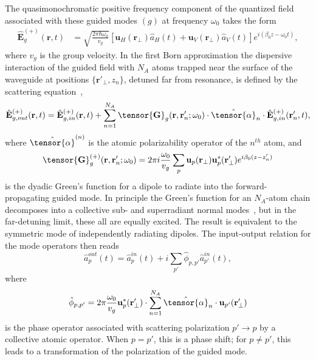 \documentclass[preprint,aps,pra,onecolumn,superscriptaddress]{revtex4-1} %
\def\br{\mathbf{r}}
\newcommand{\mbf}[1]{\mathbf{#1}}
\begin{document}
The quasimonochromatic positive frequency component of the quantized field associated with these guided modes $(g)$ at frequency $\omega_0$ takes the form
\begin{align}\label{eq:Ebp}
\hat{\mathbf{E}}^{(+)}_g(\mbf{r}, t) &= \sqrt{ \frac{2 \pi \hbar \omega_0}{ v_g} } \left[\mathbf{u}_H(\mbf{r}\!_\perp)  \hat{a}_H(t) + \mathbf{u}_V(\mbf{r}\!_\perp) \hat{a}_V(t)\right]  e^{i (\beta_0 z- \omega_0 t)},
\end{align}
where $v_g$ is the group velocity.  In the first Born approximation the dispersive interaction of the guided field with $N_A$ atoms trapped near the surface of the waveguide at positions $\{\mbf{r}'_\perp, z_n\}$, detuned far from resonance,  is defined by the scattering equation~\cite{Qi2016},
\begin{equation}
\hat{\mathbf{E}}^{(+)}_{g,out}(\mbf{r}, t)=\hat{\mathbf{E}}^{(+)}_{g,in}(\mbf{r}, t)+\sum_{n=1}^{N_A} \tensor{\mbf{G}}_{g} (\mbf{r}, \mbf{r}'_n;\omega_0) \cdot \hat{\tensor{\alpha}}_n \cdot \hat{\mathbf{E}}^{(+)}_{g,in}(\mbf{r}'_n, t),
\end{equation}
where $\hat{\tensor{\alpha}}^{(n)}$ is the atomic polarizability operator of the $n^{th}$ atom, and 
\begin{equation}
		\tensor{\mathbf{G}}^{(+)}_g(\br,\br'_n; \omega_0) =  2\pi i \frac{\omega_0}{v_g } \sum_{p} \mathbf{u}_{p} (\br_\perp)\mathbf{u}^*_{p} 
(\br_{\perp}^\prime) e^{i \beta_0(z-z'_n)}  \label{Eq::GreensGuided}
\end{equation}
is the dyadic Green's function for a dipole to radiate into the forward-propagating guided mode.  In principle the Green's function for an $N_A$-atom chain decomposes into a collective sub- and superradiant normal modes~\cite{Asenjo-Garcia2017Atom,Asenjo-Garcia2017Exponential}, but in the far-detuning limit, these all are equally excited.  The result is equivalent to the symmetric mode of independently radiating dipoles.  The input-output relation for the mode operators then reads~\cite{Qi2016}
\begin{equation}
\hat{a}^{out}_p(t) = \hat{a}^{in}_p(t)  +i \sum_{p'} \hat{\phi}_{p,p'} \hat{a}^{in}_{p'}(t) ,
\end{equation}
where 
\begin{equation}
\hat{\phi}_{p,p'} = 2\pi \frac{\omega_0}{v_g} \mbf{u}^*_p (\mbf{r}'_\perp) \cdot \sum_{n=1}^{N_A} \hat{\tensor{\alpha}}_n \cdot \mbf{u}_{p'} (\mbf{r}'_\perp)
\end{equation}
is the phase operator associated with scattering polarization $p' \rightarrow p$ by a collective atomic operator.  When $p=p'$, this is a phase shift; for $p \neq p'$, this leads to a transformation of the polarization of the guided mode.
\end{document}

